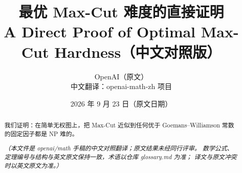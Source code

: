 \documentclass[11pt]{ctexart}
\title{最优 Max-Cut 难度的直接证明\\{\large A Direct Proof of Optimal Max-Cut Hardness（中文对照版）}}
\author{OpenAI（原文）\\中文翻译：openai-math-zh 项目}
\date{2026 年 9 月 23 日（原文日期）}
\theoremstyle{definition}
\theoremstyle{remark}
\numberwithin{equation}{section}
\begin{document}
\maketitle
\begin{abstract}
我们证明：在简单无权图上，把 Max-Cut 近似到任何优于
Goemans--Williamson 常数的固定因子都是 NP 难的。

\smallskip
\emph{（本文件是 openai/math 手稿的中文对照翻译；原文结果未经同行评审。
数学公式、定理编号与结构与英文原文保持一致，术语以仓库 glossary.md 为准；
译文与原文冲突时以英文原文为准。）}
\end{abstract}











\appendix





\end{document}
